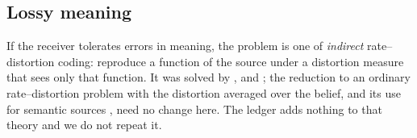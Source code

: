 \subsection{Lossy meaning}\label{sec:lossy}
If the receiver tolerates errors in meaning, the problem is one of \emph{indirect} rate--distortion coding: reproduce a function of the source under a distortion measure that sees only that function. It was solved by \citet{dobrushin1962}, \citet{wolf1970} and \citet{witsenhausen1980}; the reduction to an ordinary rate--distortion problem with the distortion averaged over the belief, and its use for semantic sources \citep{liu2021}, need no change here. The ledger adds nothing to that theory and we do not repeat it.
